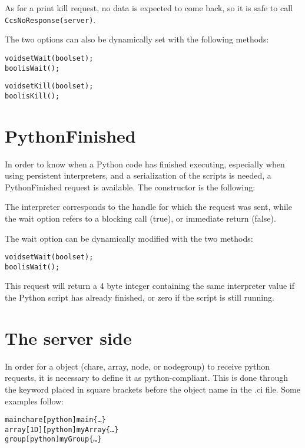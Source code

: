 As for a print kill request, no data is expected to come back, so it is safe to
call \texttt{CcsNoResponse(server)}.

The two options can also be dynamically set with the following methods:

\begin{alltt}
void setWait(bool set);
bool isWait();

void setKill(bool set);
bool isKill();
\end{alltt}

\section{PythonFinished}
\label{pythonFinished}

In order to know when a Python code has finished executing, especially when
using persistent interpreters, and a serialization of the scripts is needed, a
PythonFinished request is available. The constructor is the following:


The interpreter corresponds to the handle for which the request was sent, while
the wait option refers to a blocking call (true), or immediate return (false).

The wait option can be dynamically modified with the two methods:

\begin{alltt}
void setWait(bool set);
bool isWait();
\end{alltt}

This request will return a 4 byte integer containing the same interpreter value
if the Python script has already finished, or zero if the script is still
running.

\section{The server side}
\label{pythonServer}

In order for a \charmpp{} object (chare, array, node, or nodegroup) to receive
python requests, it is necessary to define it as python-compliant. This is done
through the keyword  placed in square brackets before the object name
in the .ci file. Some examples follow:

\begin{alltt}
mainchare [python] main \{\ldots\}
array [1D] [python] myArray \{\ldots\}
group [python] myGroup \{\ldots\}
\end{alltt}

